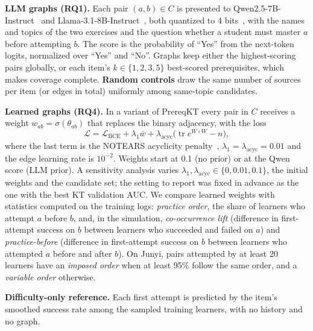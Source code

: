 \documentclass[lettersize,journal]{IEEEtran}
\begin{document}
\textbf{LLM graphs (RQ1).} Each pair $(a,b)\in C$ is presented to Qwen2.5-7B-Instruct~\cite{qwen2024qwen25} and Llama-3.1-8B-Instruct~\cite{grattafiori2024llama}, both quantized to 4 bits~\cite{dettmers2023qlora}, with the names and topics of the two exercises and the question whether a student must master $a$ before attempting $b$. The score is the probability of ``Yes'' from the next-token logits, normalized over ``Yes'' and ``No''. Graphs keep either the highest-scoring pairs globally, or each item's $k\in\{1,2,3,5\}$ best-scored prerequisites, which makes coverage complete. \textbf{Random controls} draw the same number of sources per item (or edges in total) uniformly among same-topic candidates.

\textbf{Learned graphs (RQ4).} In a variant of PrereqKT every pair in $C$ receives a weight $w_{ab}=\sigma(\theta_{ab})$ that replaces the binary adjacency, with the loss
\begin{equation}
\mathcal L=\mathcal L_{\mathrm{BCE}}+\lambda_1\overline{w}+\lambda_{\mathrm{acyc}}\big(\operatorname{tr}e^{W\circ W}-n\big),
\end{equation}
where the last term is the NOTEARS acyclicity penalty~\cite{zheng2018dags}, $\lambda_1=\lambda_{\mathrm{acyc}}=0.01$ and the edge learning rate is $10^{-2}$. Weights start at 0.1 (no prior) or at the Qwen score (LLM prior). A sensitivity analysis varies $\lambda_1,\lambda_{\mathrm{acyc}}\in\{0,0.01,0.1\}$, the initial weights and the candidate set; the setting to report was fixed in advance as the one with the best KT validation AUC. We compare learned weights with statistics computed on the training logs: \emph{practice order}, the share of learners who attempt $a$ before $b$, and, in the simulation, \emph{co-occurrence lift} (difference in first-attempt success on $b$ between learners who succeeded and failed on $a$) and \emph{practice-before} (difference in first-attempt success on $b$ between learners who attempted $a$ before and after $b$). On Junyi, pairs attempted by at least 20 learners have an \emph{imposed order} when at least 95\% follow the same order, and a \emph{variable order} otherwise.

\textbf{Difficulty-only reference.} Each first attempt is predicted by the item's smoothed success rate among the sampled training learners, with no history and no graph.
\end{document}
